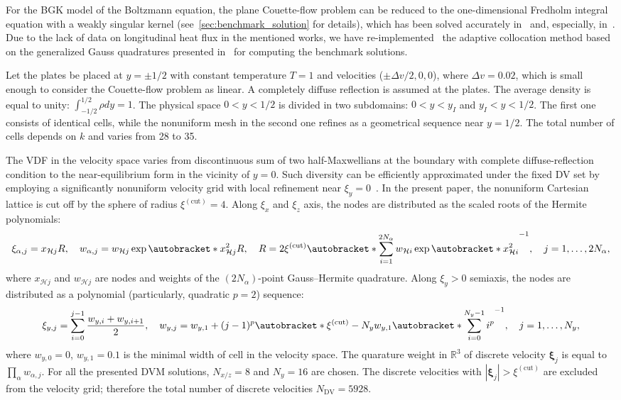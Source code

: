\documentclass{elsarticle} %
\DeclarePairedDelimiter\autobracket()       %
\newcommand{\br}[1]{\autobracket*{#1}}
\newcommand{\bxi}{\boldsymbol{\xi}}
\newcommand{\DV}{\mathrm{DV}}
\newcommand{\Herm}{\mathcal{H}}
\newcommand{\cut}{{(\mathrm{cut})}}
\newcommand{\xiaj}{\xi_{\alpha,j}}
\begin{document}
For the BGK model of the Boltzmann equation, the plane Couette-flow problem can be reduced
to the one-dimensional Fredholm integral equation with a weakly singular kernel
(see~\ref{sec:benchmark_solution} for details),
which has been solved accurately in~\cite{Luo2015} and, especially, in~\cite{Luo2016}.
Due to the lack of data on longitudinal heat flux in the mentioned works,
we have re-implemented~\cite{Rogozin2019couette}
the adaptive collocation method based on the generalized Gauss quadratures presented in~\cite{Luo2016}
for computing the benchmark solutions.

Let the plates be placed at \(y = \pm 1/2\) with constant temperature \(T = 1\)
and velocities (\(\pm\Delta v/2,0,0\)), where \(\Delta v=0.02\),
which is small enough to consider the Couette-flow problem as linear.
A completely diffuse reflection is assumed at the plates.
The average density is equal to unity: \(\int_{-1/2}^{1/2}\rho dy=1\).
The physical space \(0 < y < 1/2\) is divided in two subdomains: \(0 < y < y_I\) and \(y_I < y < 1/2\).
The first one consists of identical cells,
while the nonuniform mesh in the second one refines as a geometrical sequence near \(y = 1/2\).
The total number of cells depends on \(k\) and varies from 28 to 35.

The VDF in the velocity space varies from discontinuous sum of two half-Maxwellians at the boundary
with complete diffuse-reflection condition to the near-equilibrium form in the vicinity of \(y=0\).
Such diversity can be efficiently approximated under the fixed DV set by employing
a significantly nonuniform velocity grid with local refinement near \(\xi_y=0\)~\cite{Ohwada1990, Wu2014, Rogozin2016}.
In the present paper, the nonuniform Cartesian lattice is cut off by the sphere of radius \(\xi^\cut=4\).
Along \(\xi_x\) and \(\xi_z\) axis, the nodes are distributed as the scaled roots of the Hermite polynomials:
\begin{equation}\label{eq:vgrid_hermite}
    \xiaj = x_{\Herm j} R, \quad w_{\alpha,j} = w_{\Herm j}\exp\br{x_{\Herm j}^2}R, \quad
    R = 2\xi^\cut \br{ \sum_{i=1}^{2N_{\alpha}} w_{\Herm i} \exp\br{x_{\Herm i}^2} }^{-1}, \quad
    j = 1,\dots,2N_{\alpha},
\end{equation}
where \(x_{\Herm j}\) and \(w_{\Herm j}\) are nodes and weights of the \((2N_{\alpha})\)-point Gauss--Hermite quadrature.
Along \(\xi_y>0\) semiaxis, the nodes are distributed as a polynomial (particularly, quadratic \(p=2\)) sequence:
\begin{equation}\label{eq:vgrid_polynomial}
    \xi_{y,j} = \sum_{i=0}^{j-1} \frac{w_{y,i} + w_{y,i+1}}2, \quad
    w_{y,j} = w_{y,1} + (j-1)^p \br{\xi^\cut - N_y w_{y,1}} \br{\sum_{i=0}^{N_y-1} i^p}^{-1}, \quad
    j = 1,\dots,N_y,
\end{equation}
where \(w_{y,0}=0\), \(w_{y,1}=0.1\) is the minimal width of cell in the velocity space.
The quarature weight in \(\mathbb{R}^3\) of discrete velocity \(\bxi_j\)
is equal to \(\prod_\alpha w_{\alpha,j}\).
For all the presented DVM solutions, \(N_{x/z}=8\) and \(N_y=16\) are chosen.
The discrete velocities with \(|\bxi_j| > \xi^\cut\) are excluded from the velocity grid;
therefore the total number of discrete velocities \(N_\DV=5928\).
\end{document}
